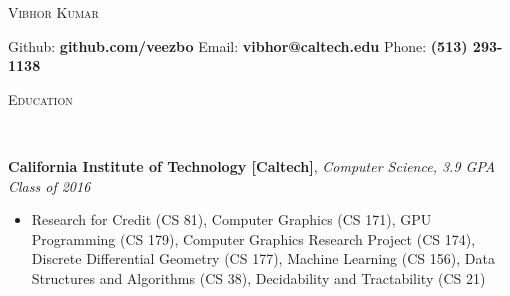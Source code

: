 \documentclass[9pt]{article}
\newenvironment{changemargin}[2]{%
  \begin{list}{}{%
    \setlength{\topsep}{0pt}%
    \setlength{\leftmargin}{#1}%
    \setlength{\rightmargin}{#2}%
    \setlength{\listparindent}{\parindent}%
    \setlength{\itemindent}{\parindent}%
    \setlength{\parsep}{\parskip}%
  }%
  \item[]}{\end{list}
}
\newcommand{\lineover}{
	\begin{changemargin}{-0.05in}{-0.05in}
		\vspace*{-8pt}
		\hrulefill \\
		\vspace*{-2pt}
	\end{changemargin}
}
\newcommand{\header}[1]{
	\begin{changemargin}{-0.5in}{-0.5in}
		\scshape{#1}\\
  	\lineover
	\end{changemargin}
}
\newenvironment{body} {
	\vspace*{-16pt}
	\begin{changemargin}{-0.25in}{-0.5in}
  }	
	{\end{changemargin}
}
\begin{document}
\begin{center} 
	{\Large \scshape Vibhor Kumar} 
\end{center}
Github: \textbf{github.com/veezbo} \hspace{5mm} Email: \textbf{vibhor@caltech.edu} \hfill Phone: \textbf{(513) 293-1138}\\
\vspace{3pt}
\header{Education}
\smallskip
\begin{body}
	\vspace{14pt}
	\textbf{California Institute of Technology [Caltech]}{}, \emph{Computer Science, 3.9 GPA} \hfill \emph{Class of 2016}{} \\
	\begin{itemize} \itemsep -0pt
	\item Research for Credit (CS 81), Computer Graphics (CS 171), GPU Programming (CS 179),  Computer Graphics Research Project (CS 174), Discrete Differential Geometry (CS 177), Machine Learning (CS 156), Data Structures and Algorithms (CS 38), Decidability and Tractability (CS 21)
	\end{itemize}
\end{body}

\end{document}
